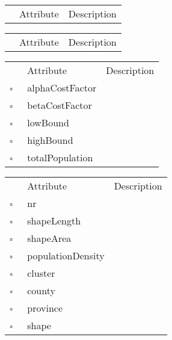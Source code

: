 \begin{table}
\caption{Nuts3  }

\begin{longtable}{llp{8cm}}
& Attribute & Description \\
\end{longtable}
\label{attr:Nuts3}
\end{table}

\begin{table}
\caption{Province  }

\begin{longtable}{llp{8cm}}
& Attribute & Description \\
\end{longtable}
\label{attr:Province}
\end{table}

\clearpage
\begin{table}
\caption{Scenario  This class describes the dataset for the application. Typically there is a single instance of this class in the application at all times.}

\begin{longtable}{llp{8cm}}
& Attribute & Description \\
$\square$\ & alphaCostFactor &  \\
$\square$\ & betaCostFactor &  \\
$\square$\ & lowBound &  \\
$\square$\ & highBound &  \\
$\square$\ & totalPopulation &  \\
\end{longtable}
\label{attr:Scenario}
\end{table}

\begin{table}
\caption{Shaped  }

\begin{longtable}{llp{8cm}}
& Attribute & Description \\
$\square$\ & nr &  \\
$\square$\ & shapeLength &  \\
$\square$\ & shapeArea &  \\
$\square$\ & populationDensity &  \\
$\square$\ & cluster &  \\
$\square$\ & county &  \\
$\square$\ & province &  \\
$\square$\ & shape &  \\
\end{longtable}
\label{attr:Shaped}
\end{table}

